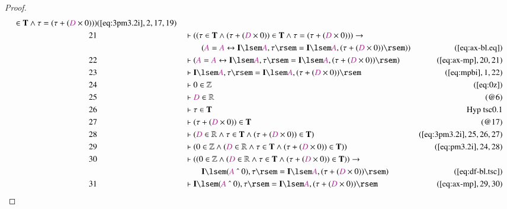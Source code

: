 \begin{proof}
\begin{align}
      \in \mathbf{T} \wedge \tau = ( \tau + ( \mc{D} \times
      0 ) ) )&(\mbox{\ref{eq:3pm3.2i}},2,17,19)\notag
  \\ 21 &&  & \vdash ( ( \tau \in \mathbf{T} \wedge ( \tau + ( \mc{D} \times 0 )
      ) \in \mathbf{T} \wedge \tau = ( \tau + ( \mc{D}
      \times 0 ) ) ) \rightarrow  \notag \\ & & & \qquad
      ( \mc{A} = \mc{A}
      \leftrightarrow \mathbf{I} \lsem \mc{A} , \tau \rsem
      = \mathbf{I} \lsem \mc{A} , ( \tau + ( \mc{D} \times 0
      ) ) \rsem ) )&(\mbox{\ref{eq:ax-bl.eq}})\notag
  \\ 22 &&  & \vdash ( \mc{A} = \mc{A} \leftrightarrow \mathbf{I} \lsem \mc{A}
      , \tau \rsem = \mathbf{I} \lsem \mc{A} , ( \tau + (
      \mc{D} \times 0 ) ) \rsem
      )&(\mbox{\ref{eq:ax-mp}},20,21)\notag
  \\ 23 &&  & \vdash \mathbf{I} \lsem \mc{A} , \tau \rsem = \mathbf{I} \lsem
      \mc{A} , ( \tau + ( \mc{D} \times 0 ) )
      \rsem&(\mbox{\ref{eq:mpbi}},1,22)\notag
  \\ 24 &&  & \vdash 0 \in \mathbb{Z}&(\mbox{\ref{eq:0z}})\notag
  \\ 25 &&  & \vdash \mc{D} \in \mathbb{R}&(@6)\notag
  \\ 26 &&  & \vdash \tau \in \mathbf{T}&\text{Hyp~tsc0.1}\notag%
  \\ 27 &&  & \vdash ( \tau + ( \mc{D} \times 0 ) ) \in \mathbf{T}&(@17)\notag
  \\ 28 &&  & \vdash ( \mc{D} \in \mathbb{R} \wedge \tau \in \mathbf{T} \wedge
      ( \tau + ( \mc{D} \times 0 ) ) \in \mathbf{T}
      )&(\mbox{\ref{eq:3pm3.2i}},25,26,27)\notag
  \\ 29 &&  & \vdash ( 0 \in \mathbb{Z} \wedge ( \mc{D} \in \mathbb{R} \wedge
      \tau \in \mathbf{T} \wedge ( \tau + ( \mc{D} \times 0
      ) ) \in \mathbf{T} )
      )&(\mbox{\ref{eq:pm3.2i}},24,28)\notag
  \\ 30 &&  & \vdash ( ( 0 \in \mathbb{Z} \wedge ( \mc{D} \in \mathbb{R} \wedge
      \tau \in \mathbf{T} \wedge ( \tau + ( \mc{D} \times 0
      ) ) \in \mathbf{T} ) ) \rightarrow  \notag \\ & & & \qquad
      \mathbf{I} \lsem (
      \mc{A} ~\string^~ 0 ) , \tau \rsem = \mathbf{I} \lsem
      \mc{A} , ( \tau + ( \mc{D} \times 0 ) ) \rsem
      )&(\mbox{\ref{eq:df-bl.tsc}})\notag
  \\ 31 &&  & \vdash \mathbf{I} \lsem ( \mc{A} ~\string^~ 0 ) , \tau \rsem =
      \mathbf{I} \lsem \mc{A} , ( \tau + ( \mc{D} \times 0 )
      ) \rsem&(\mbox{\ref{eq:ax-mp}},29,30)\notag

\end{align}
\end{proof}
